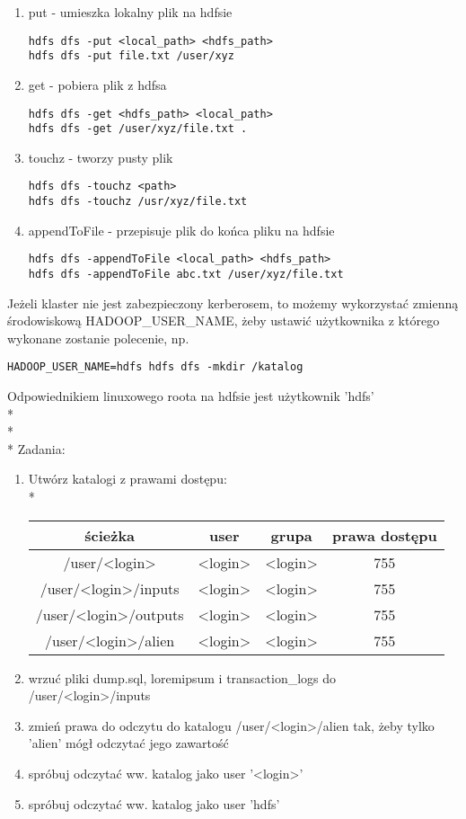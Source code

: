 \documentclass[11pt]{article}
\begin{document}
\begin{enumerate}
\item put - umieszka lokalny plik na hdfsie
\begin{lstlisting}
hdfs dfs -put <local_path> <hdfs_path>
hdfs dfs -put file.txt /user/xyz
\end{lstlisting}

\item get - pobiera plik z hdfsa
\begin{lstlisting}
hdfs dfs -get <hdfs_path> <local_path>
hdfs dfs -get /user/xyz/file.txt .
\end{lstlisting}

\item touchz - tworzy pusty plik
\begin{lstlisting}
hdfs dfs -touchz <path>
hdfs dfs -touchz /usr/xyz/file.txt
\end{lstlisting}

\item appendToFile - przepisuje plik do końca pliku na hdfsie
\begin{lstlisting}
hdfs dfs -appendToFile <local_path> <hdfs_path>
hdfs dfs -appendToFile abc.txt /user/xyz/file.txt
\end{lstlisting}

\end{enumerate}

Jeżeli klaster nie jest zabezpieczony kerberosem, to możemy wykorzystać zmienną środowiskową HADOOP\_USER\_NAME, żeby ustawić użytkownika z którego wykonane zostanie polecenie, np.
\begin{lstlisting}
HADOOP_USER_NAME=hdfs hdfs dfs -mkdir /katalog
\end{lstlisting}
Odpowiednikiem linuxowego roota na hdfsie jest użytkownik 'hdfs'
\\*
\\*
\\*
Zadania:
\begin{enumerate}
	\item Utwórz katalogi z prawami dostępu:\\*

\begin{tabular}{c | c | c | c}
	ścieżka & user & grupa & prawa dostępu \\ \hline 
	/user/<login> & <login> & <login> & 755 \\
	/user/<login>/inputs & <login> & <login> & 755 \\
	/user/<login>/outputs & <login> & <login> & 755 \\
	/user/<login>/alien & <login> & <login> & 755 \\
\end{tabular}

\item wrzuć pliki dump.sql, loremipsum i transaction\_logs do /user/<login>/inputs
\item zmień prawa do odczytu do katalogu /user/<login>/alien tak, żeby tylko 'alien' mógł odczytać jego zawartość
\item spróbuj odczytać ww. katalog jako user ’<login>’
\item spróbuj odczytać ww. katalog jako user ’hdfs’
\end{enumerate}
\end{document}
